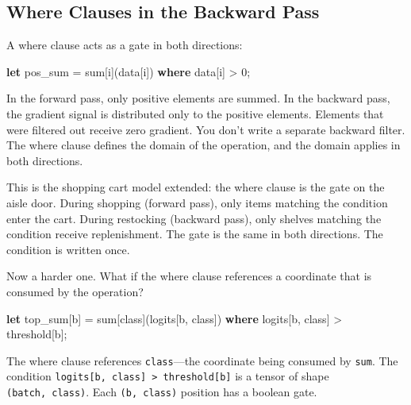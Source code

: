 \documentclass[11pt,titlepage]{article}
\newenvironment{Shaded}{}{}
\newcommand{\DecValTok}[1]{\textcolor[rgb]{0.25,0.63,0.44}{#1}}
\newcommand{\KeywordTok}[1]{\textcolor[rgb]{0.00,0.44,0.13}{\textbf{#1}}}
\newcommand{\NormalTok}[1]{#1}
\newcommand{\OperatorTok}[1]{\textcolor[rgb]{0.40,0.40,0.40}{#1}}
\begin{document}
\hypertarget{where-clauses-in-the-backward-pass}{%
\subsection{Where Clauses in the Backward
Pass}\label{where-clauses-in-the-backward-pass}}

A where clause acts as a gate in both directions:

\begin{Shaded}
\begin{Highlighting}[]
\KeywordTok{let}\NormalTok{ pos_sum = sum}\OperatorTok{[}\NormalTok{i}\OperatorTok{]}\NormalTok{(data}\OperatorTok{[}\NormalTok{i}\OperatorTok{]}\NormalTok{) }\KeywordTok{where}\NormalTok{ data}\OperatorTok{[}\NormalTok{i}\OperatorTok{]}\NormalTok{ > }\DecValTok{0}\NormalTok{;}
\end{Highlighting}
\end{Shaded}

In the forward pass, only positive elements are summed. In the backward
pass, the gradient signal is distributed only to the positive elements.
Elements that were filtered out receive zero gradient. You don't write a
separate backward filter. The where clause defines the domain of the
operation, and the domain applies in both directions.

This is the shopping cart model extended: the where clause is the gate
on the aisle door. During shopping (forward pass), only items matching
the condition enter the cart. During restocking (backward pass), only
shelves matching the condition receive replenishment. The gate is the
same in both directions. The condition is written once.

Now a harder one. What if the where clause references a coordinate that
is consumed by the operation?

\begin{Shaded}
\begin{Highlighting}[]
\KeywordTok{let}\NormalTok{ top_sum}\OperatorTok{[}\NormalTok{b}\OperatorTok{]}\NormalTok{ = sum}\OperatorTok{[}\NormalTok{class}\OperatorTok{]}\NormalTok{(logits}\OperatorTok{[}\NormalTok{b, class}\OperatorTok{]}\NormalTok{) }\KeywordTok{where}\NormalTok{ logits}\OperatorTok{[}\NormalTok{b, class}\OperatorTok{]}\NormalTok{ > threshold}\OperatorTok{[}\NormalTok{b}\OperatorTok{]}\NormalTok{;}
\end{Highlighting}
\end{Shaded}

The where clause references \texttt{class}---the coordinate being
consumed by \texttt{sum}. The condition
\texttt{logits{[}b,\ class{]}\ \textgreater{}\ threshold{[}b{]}} is a
tensor of shape \texttt{(batch,\ class)}. Each \texttt{(b,\ class)}
position has a boolean gate.
\end{document}

